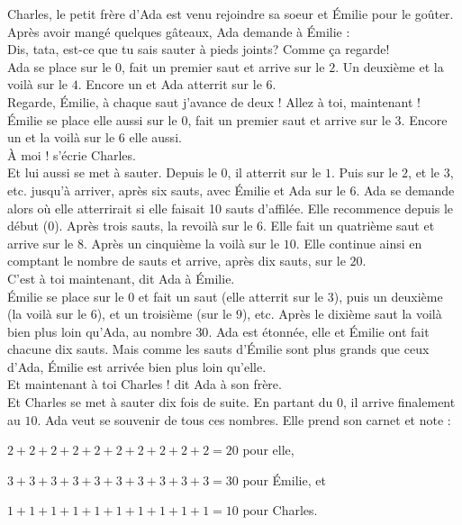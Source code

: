 Charles, le petit frère d'Ada est venu rejoindre sa soeur et Émilie pour le goûter. Après avoir mangé quelques gâteaux, Ada demande à Émilie : \\
\guillemotleft Dis, tata, est-ce que tu sais sauter à pieds joints? Comme ça regarde! \guillemotright\\
Ada se place sur le $0$, fait un premier saut et arrive sur le $2$. Un deuxième et la voilà sur le $4$. Encore un et Ada atterrit sur le $6$.\\
\guillemotleft Regarde, Émilie, à chaque saut j’avance de deux ! Allez à toi, maintenant ! \guillemotright\\
Émilie se place elle aussi sur le $0$, fait un premier saut et arrive sur le $3$. Encore un et la voilà sur le $6$ elle aussi. \\
\guillemotleft À moi ! s'écrie Charles. \guillemotright\\
Et lui aussi se met à sauter. Depuis le $0$, il atterrit sur le $1$. Puis sur le $2$, et le $3$, etc. jusqu'à arriver, après six sauts, avec Émilie et Ada sur le $6$.
Ada se demande alors où elle atterrirait si elle faisait 10 sauts d'affilée. 
Elle recommence depuis le début ($0$). Après trois sauts, la revoilà sur le $6$. 
Elle fait un quatrième saut et arrive sur le $8$. 
Après un cinquième la voilà sur le $10$. Elle continue ainsi en comptant le nombre de sauts et arrive, après dix sauts, sur le $20$. \\
\guillemotleft C’est à toi maintenant, dit Ada à Émilie. \guillemotright\\
Émilie se place sur le $0$ et fait un saut (elle atterrit sur le $3$), puis un deuxième (la voilà sur le $6$), et un troisième (sur le $9$), etc. Après le dixième saut la voilà bien plus loin qu’Ada, au nombre $30$.
Ada est étonnée, elle et Émilie ont fait chacune dix sauts. Mais comme les sauts d’Émilie sont plus grands que ceux d’Ada, Émilie est arrivée bien plus loin qu’elle.\\ 
\guillemotleft Et maintenant à toi Charles ! dit Ada à son frère. \guillemotright\\
Et Charles se met à sauter dix fois de suite. En partant du $0$, il arrive finalement au $10$.
Ada veut se souvenir de tous ces nombres. Elle prend son carnet et note :
\begin{description}[leftmargin=0.5cm]
    \item $2+2+2+2+2+2+2+2+2+2=20$ pour elle,
    \item $3+3+3+3+3+3+3+3+3+3=30$ pour Émilie, et
    \item $1+1+1+1+1+1+1+1+1+1=10$ pour Charles.
\end{description}
